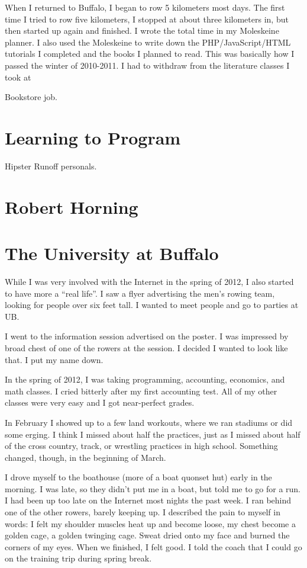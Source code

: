 \documentclass[12pt]{article}
\begin{document}
When I returned to Buffalo, I began to row 5 kilometers most days.  The first
time I tried to row five kilometers, I stopped at about three kilometers in, but
then started up again and finished.  I wrote the total time in my Moleskeine
planner.  I also used the Moleskeine to write down the PHP/JavaScript/HTML
tutorials I completed and the books I planned to read.  This was basically how I
passed the winter of 2010-2011.  I had to withdraw from the literature classes I
took at 

Bookstore job.  

\section{Learning to Program}
Hipster Runoff personals.

\section{Robert Horning}

\section{The University at Buffalo}
While I was very involved with the Internet in the spring of 2012, I also
started to have more a ``real life''.  I saw a flyer advertising the men's
rowing team, looking for people over six feet tall.   I wanted to
meet people and go to parties at UB. 

I went to the information session advertised on the poster.  I was impressed by
 broad chest of one of the rowers at the session.  I decided I
wanted to look like that.  I put my name down.

In the spring of 2012, I was taking programming, accounting, economics, and
math classes.  I cried bitterly after my first accounting test.  All of my
other classes were very easy and I got near-perfect grades.

In February I showed up to a few land workouts, where we ran stadiums or did
some erging.  I think I missed about half the practices, just as I missed about
half of the cross country, track, or wrestling practices in high school.
Something changed, though, in the beginning of March.

I drove myself to the boathouse (more of a boat quonset hut) early in the
morning.  I was late, so they didn't put me in a boat, but told me to go for a
run.  I had been up too late on the Internet most nights the past week.  I ran
behind one of the other rowers, barely keeping up.  I described the pain to
myself in words: I felt my shoulder muscles heat up and become loose, my chest
become a golden cage, a golden twinging cage.  Sweat dried onto my face and
burned the corners of my eyes.  When we finished, I felt good.  I told the coach
that I could go on the training trip during spring break.  
\end{document}
